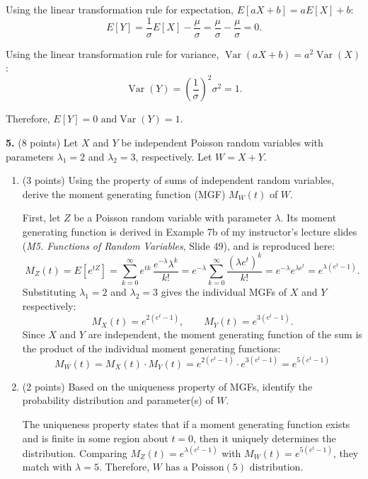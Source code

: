 \documentclass[letterpaper]{article}
\begin{document}
Using the linear transformation rule for expectation, $E[a X + b] = a E[X] + b$:
\[
    E[Y] = \frac{1}{\sigma}E[X] - \frac{\mu}{\sigma} = \frac{\mu}{\sigma} - \frac{\mu}{\sigma} = 0.
\]

Using the linear transformation rule for variance, $\operatorname{Var}(a X + b) = a^2\operatorname{Var}(X)$:
\[
    \operatorname{Var}(Y) = \left(\frac{1}{\sigma}\right)^2\sigma^2 = 1.
\]

Therefore, $\boxed{E[Y] = 0 \text{ and} \operatorname{Var}(Y) = 1}$.

\textbf{5.} (8 points) Let $X$ and $Y$ be independent Poisson random variables with parameters $\lambda_1 = 2$ and $\lambda_2 = 3$, respectively. Let $W = X + Y$.

\begin{enumerate}[label=(\alph*), leftmargin=*]
    \item (3 points) Using the property of sums of independent random variables, derive the moment generating function (MGF) $M_W(t)$ of $W$.

    First, let $Z$ be a Poisson random variable with parameter $\lambda$. Its moment generating function is derived in Example 7b of my instructor's lecture slides (\textit{M5. Functions of Random Variables}, Slide 49), and is reproduced here:
    \[
        M_Z(t) = E[e^{tZ}] = \sum_{k=0}^{\infty} e^{tk}\,\frac{e^{-\lambda}\lambda^k}{k!}
        = e^{-\lambda}\sum_{k=0}^{\infty}\frac{(\lambda e^t)^k}{k!}
        = e^{-\lambda}e^{\lambda e^t} = e^{\lambda(e^t - 1)}.
    \]
    Substituting $\lambda_1 = 2$ and $\lambda_2 = 3$ gives the individual MGFs of $X$ and $Y$ respectively:
    \[
        M_X(t) = e^{2(e^t - 1)}, \qquad M_Y(t) = e^{3(e^t - 1)}.
    \]
    Since $X$ and $Y$ are independent, the moment generating function of the sum is the product of the individual moment generating functions:
    \[
        M_W(t) = M_X(t)\cdot M_Y(t) = e^{2(e^t-1)}\cdot e^{3(e^t-1)} = \boxed{e^{5(e^t - 1)}}
    \]

    \item (2 points) Based on the uniqueness property of MGFs, identify the probability distribution and parameter(s) of $W$.

    The uniqueness property states that if a moment generating function exists and is finite in some region about $t = 0$, then it uniquely determines the distribution. Comparing $M_Z(t) = e^{\lambda(e^t-1)}$ with $M_W(t) = e^{5(e^t-1)}$, they match with $\lambda = 5$. Therefore, $\boxed{W \text{ has a Poisson}(5) \text{ distribution}}$.


\end{enumerate}
\end{document}
